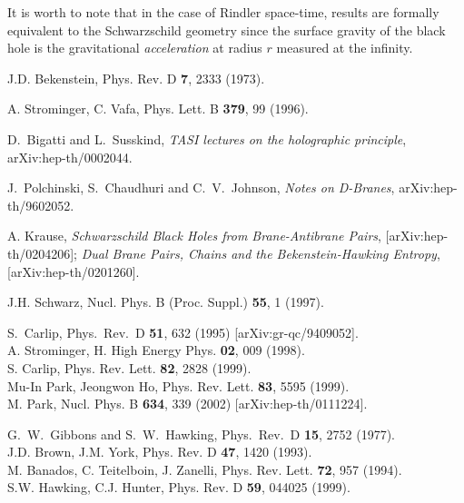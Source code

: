  It is worth to note that in the case of Rindler
space-time, results are formally equivalent to the Schwarzschild
geometry since the surface gravity of the black hole is the
gravitational {\it acceleration} at radius $r$ measured at the
infinity.


 \begin{thebibliography}{99}
 J.D. Bekenstein, Phys. Rev. D {\bf 7}, 2333
                    (1973).

 A. Strominger, C. Vafa, Phys. Lett. B {\bf 379}, 99
                (1996).

D.~Bigatti and L.~Susskind, {\it TASI lectures on the holographic
principle}, arXiv:hep-th/0002044.

J.~Polchinski, S.~Chaudhuri and C.~V.~Johnson, {\it Notes on
D-Branes}, arXiv:hep-th/9602052.

 A. Krause, {\it Schwarzschild Black Holes from Brane-Antibrane
                Pairs}, [arXiv:hep-th/0204206]; {\it Dual Brane Pairs, Chains and
                the Bekenstein-Hawking Entropy},
                [arXiv:hep-th/0201260].

 J.H. Schwarz, Nucl. Phys. B (Proc. Suppl.) {\bf 55}, 1 (1997).

S.~Carlip,
Phys.\ Rev.\ D {\bf 51}, 632 (1995) [arXiv:gr-qc/9409052].
 \\
                 A. Strominger, H. High Energy Phys. {\bf 02}, 009 (1998). \\
                 S. Carlip, Phys. Rev. Lett. {\bf 82}, 2828 (1999). \\
                  Mu-In Park, Jeongwon Ho, Phys. Rev. Lett. {\bf 83}, 5595
                  (1999). \\
                 M. Park, Nucl. Phys. B {\bf 634}, 339 (2002)
                 [arXiv:hep-th/0111224].

G.~W.~Gibbons and S.~W.~Hawking,
Phys.\ Rev.\ D {\bf 15}, 2752 (1977).
             \\
                  J.D. Brown, J.M. York, Phys. Rev. D {\bf 47}, 1420 (1993). \\
                  M. Banados, C. Teitelboin, J. Zanelli, Phys. Rev. Lett. {\bf 72}, 957 (1994).\\
                  S.W. Hawking, C.J. Hunter, Phys. Rev. D {\bf 59}, 044025 (1999).


\end{thebibliography}
